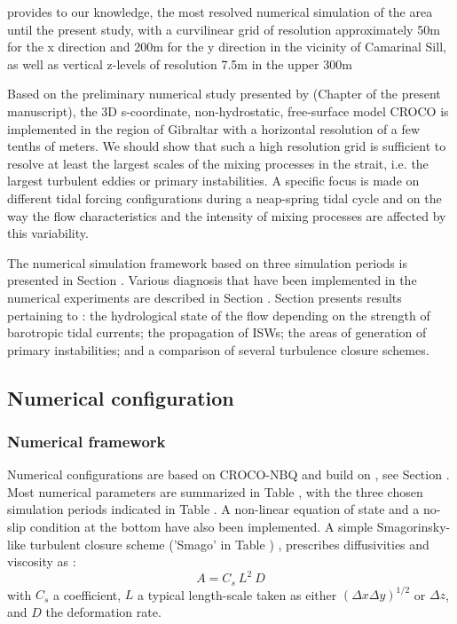 \citet{sanchez-garrido_2011} provides to our knowledge, the most resolved numerical simulation of the area until the present study, with a curvilinear grid of resolution approximately 50m for the x direction and 200m for the y direction in the vicinity of Camarinal Sill, as well as vertical z-levels of resolution 7.5m in the upper 300m

Based on the preliminary numerical study presented by \citet{hilt_2020} (Chapter  of the present manuscript), the 3D s-coordinate, non-hydrostatic, free-surface model CROCO is implemented in the region of Gibraltar with a horizontal resolution of a few tenths of meters. We should show that such a high resolution grid is sufficient to resolve at least the largest scales of the mixing processes in the strait, i.e. the largest turbulent eddies or primary instabilities. A specific focus is made on different tidal forcing configurations during a neap-spring tidal cycle and on the way the flow characteristics and the intensity of mixing processes are affected by this variability. 

The numerical simulation framework based on three simulation periods is presented in Section . Various diagnosis that have been implemented in the numerical experiments are described in Section . Section  presents results pertaining to : the hydrological state of the flow depending on the strength of barotropic tidal currents; the propagation of ISWs; the areas of generation of primary instabilities; and a comparison of several turbulence closure schemes.

\subsection{Numerical configuration}
\label{section3Dnum}

\subsubsection{Numerical framework}

Numerical configurations are based on CROCO-NBQ and build on \citet{hilt_2020}, see Section . Most numerical parameters are summarized in Table \color{red}, with the three chosen simulation periods indicated in Table \color{black}. A non-linear equation of state and a no-slip condition at the bottom have also been implemented. A simple Smagorinsky-like turbulent closure scheme ('Smago' in Table ) \citep{smagorinsky_1963}, prescribes diffusivities and viscosity as :
\begin{equation}
    A = C_s \ L^2 \ D
\end{equation}
with $C_s$ a coefficient, $L$ a typical length-scale taken as either $(\Delta x \Delta y)^{1/2}$ or $\Delta z$, and $D$ the deformation rate.

